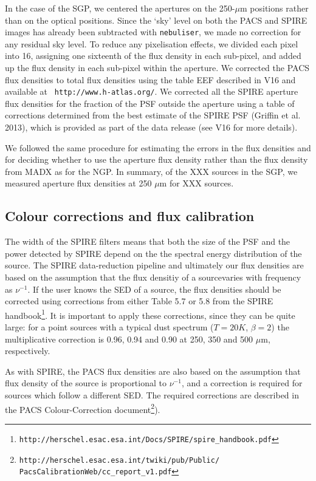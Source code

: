 \documentclass[useAMS,usenatbib]{mnras}
\begin{document}
In the case of the SGP, we centered the apertures on the 250-$\mu$m
positions rather than on the optical positions.  Since the `sky' level
on both the PACS and SPIRE images has already been subtracted with
{\tt nebuliser}, we made no correction for any residual sky level.  To
reduce any pixelisation effects, we divided each pixel into 16,
assigning one sixteenth of the flux density in each sub-pixel, and
added up the flux density in each sub-pixel within the aperture.  We
corrected the PACS flux densities to total flux densities using the
table EEF described in V16 and available at {\tt
  http://www.h-atlas.org/}.  We corrected all the SPIRE aperture flux
densities for the fraction of the PSF outside the aperture using a
table of corrections determined from the best estimate of the SPIRE
PSF (Griffin et al. 2013), which is provided as part of the data
release (see V16 for more details).

We followed the same procedure for estimating the errors in the
flux densities and for deciding whether to use the aperture flux
density rather than the flux density from MADX as for the NGP.
In summary, of the XXX sources in the SGP, we measured aperture
flux densities at 250 $\mu$m for XXX sources. 


\subsection{Colour corrections and flux calibration}

The width of the SPIRE filters means that both the size of the PSF and
the power detected by SPIRE depend on the the spectral energy
distribution of the source.  The SPIRE data-reduction pipeline and
ultimately our flux densities are based on the assumption that the
flux densitiy of a sourcevaries with frequency as $\nu^{-1}$.  If the
user knows the SED of a source, the flux densities should be corrected
using corrections from either Table 5.7 or 5.8 from the SPIRE
handbook\footnote{\tt{http://herschel.esac.esa.int/Docs/SPIRE/spire\_handbook.pdf}}.
It is important to apply these corrections, since they can be quite
large: for a point sources with a typical dust spectrum ($T=20K$,
$\beta=2$) the multiplicative correction is 0.96, 0.94 and 0.90 at
250, 350 and 500 $\mu$m, respectively.

As with SPIRE, the PACS flux densities are also based on the
assumption that flux density of the source is proportional to $\nu^{-1}$, and
a correction is required for sources which follow a different SED. The
required corrections are described in the PACS Colour-Correction
document\footnote{\tt{http://herschel.esac.esa.int/twiki/pub/Public/
  PacsCalibrationWeb/cc\_report\_v1.pdf}}).
\end{document}
